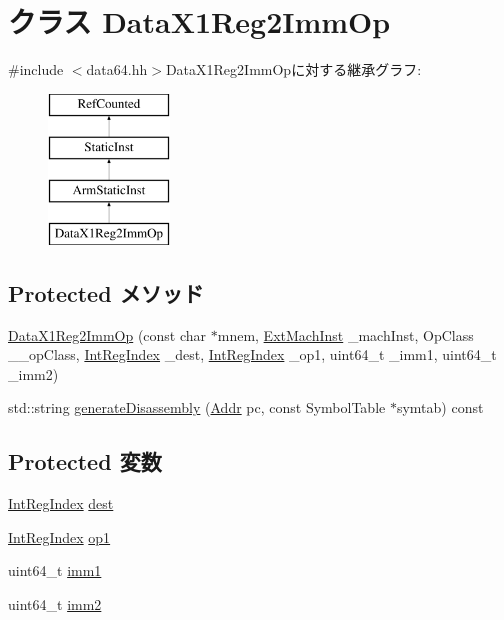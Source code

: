 \hypertarget{classArmISA_1_1DataX1Reg2ImmOp}{
\section{クラス DataX1Reg2ImmOp}
\label{classArmISA_1_1DataX1Reg2ImmOp}
}


{\ttfamily \#include $<$data64.hh$>$}DataX1Reg2ImmOpに対する継承グラフ:\begin{figure}[H]
\begin{center}
\leavevmode
\includegraphics[height=4cm]{classArmISA_1_1DataX1Reg2ImmOp}
\end{center}
\end{figure}
\subsection*{Protected メソッド}
\begin{DoxyCompactItemize}
\item 
\hyperlink{classArmISA_1_1DataX1Reg2ImmOp_a26f0bef26b3a9145885c59adc66c39dc}{DataX1Reg2ImmOp} (const char $\ast$mnem, \hyperlink{classStaticInst_a5605d4fc727eae9e595325c90c0ec108}{ExtMachInst} \_\-machInst, OpClass \_\-\_\-opClass, \hyperlink{namespaceArmISA_ae64680ba9fb526106829d6bf92fc791b}{IntRegIndex} \_\-dest, \hyperlink{namespaceArmISA_ae64680ba9fb526106829d6bf92fc791b}{IntRegIndex} \_\-op1, uint64\_\-t \_\-imm1, uint64\_\-t \_\-imm2)
\item 
std::string \hyperlink{classArmISA_1_1DataX1Reg2ImmOp_a95d323a22a5f07e14d6b4c9385a91896}{generateDisassembly} (\hyperlink{classm5_1_1params_1_1Addr}{Addr} pc, const SymbolTable $\ast$symtab) const 
\end{DoxyCompactItemize}
\subsection*{Protected 変数}
\begin{DoxyCompactItemize}
\item 
\hyperlink{namespaceArmISA_ae64680ba9fb526106829d6bf92fc791b}{IntRegIndex} \hyperlink{classArmISA_1_1DataX1Reg2ImmOp_aec72e8e45bdc87abeeeb75d2a8a9a716}{dest}
\item 
\hyperlink{namespaceArmISA_ae64680ba9fb526106829d6bf92fc791b}{IntRegIndex} \hyperlink{classArmISA_1_1DataX1Reg2ImmOp_a4c465c43ad568f8bcf8ae71480e9cfea}{op1}
\item 
uint64\_\-t \hyperlink{classArmISA_1_1DataX1Reg2ImmOp_a846a1153344f66cc5d7c5af6fc071bb4}{imm1}
\item 
uint64\_\-t \hyperlink{classArmISA_1_1DataX1Reg2ImmOp_a4b3bca3d7461f9d143e9bcd456390a27}{imm2}
\end{DoxyCompactItemize}


